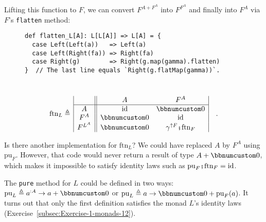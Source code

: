 \noindent Lifting this function to $F$, we can convert $F^{A+F^{A}}$
into $F^{F^{A}}$ and finally into $F^{A}$ via $F$\textsf{'}s \lstinline!flatten!
method:

\begin{wrapfigure}{l}{0.55\columnwidth}%
\vspace{-0.5\baselineskip}
\begin{lstlisting}
def flatten_L[A]: L[L[A]] => L[A] = {
  case Left(Left(a))   => Left(a)
  case Left(Right(fa)) => Right(fa)
  case Right(g)        => Right(g.map(gamma).flatten)
}  // The last line equals `Right(g.flatMap(gamma))`.
\end{lstlisting}

\vspace{-3\baselineskip}
\end{wrapfigure}%

~\vspace{-1.1\baselineskip}
\[
\text{ftn}_{L}\triangleq\,\begin{array}{|c||cc|}
 & A & F^{A}\\
\hline A & \text{id} & \bbnum 0\\
F^{A} & \bbnum 0 & \text{id}\\
F^{L^{A}} & \bbnum 0 & \gamma^{\uparrow F}\bef\text{ftn}_{F}
\end{array}\quad.
\]

Is there another implementation for $\text{ftn}_{L}$? We could have
replaced $A$ by $F^{A}$ using $\text{pu}_{F}$. However, that code
would never return a result of type $A+\bbnum 0$, which makes it
impossible to satisfy identity laws such as $\text{pu}_{F}\bef\text{ftn}_{F}=\text{id}$.

The \lstinline!pure! method for $L$ could be defined in two ways:
$\text{pu}_{L}\triangleq a^{:A}\rightarrow a+\bbnum 0$ or $\text{pu}_{L}\triangleq a\rightarrow\bbnum 0+\text{pu}_{F}(a)$.
It turns out that only the first definition satisfies the monad $L$\textsf{'}s
identity laws (Exercise~\ref{subsec:Exercise-1-monads-12}).

